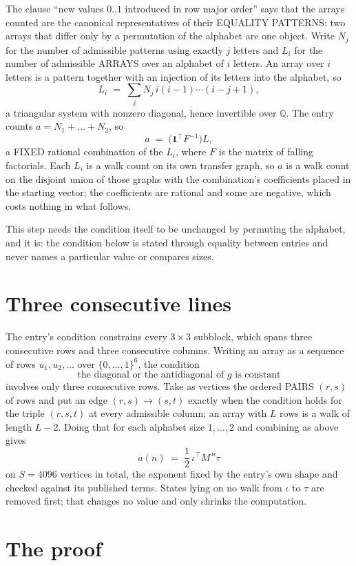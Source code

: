 \documentclass[11pt,a4paper]{article}
\theoremstyle{plain}
\theoremstyle{definition}
\begin{document}
The clause ``new values $0..1$ introduced in row major order'' says that the arrays
counted are the canonical representatives of their EQUALITY PATTERNS: two arrays that differ
only by a permutation of the alphabet are one object. Write $N_j$ for the number of admissible
patterns using exactly $j$ letters and $L_i$ for the number of admissible ARRAYS over an
alphabet of $i$ letters. An array over $i$ letters is a pattern together with an injection of
its letters into the alphabet, so
\[
L_i\;=\;\sum_{j}N_j\,i(i-1)\cdots(i-j+1),
\]
a triangular system with nonzero diagonal, hence invertible over $\mathbb{Q}$. The entry
counts $a=N_1+\dots+N_{2}$, so
\[
a\;=\;\bigl(\mathbf{1}^{\!\top}F^{-1}\bigr)L ,
\]
a FIXED rational combination of the $L_i$, where $F$ is the matrix of falling factorials.
Each $L_i$ is a walk count on its own transfer graph, so $a$ is a walk count on the disjoint
union of those graphs with the combination's coefficients placed in the starting vector; the
coefficients are rational and some are negative, which costs nothing in what follows.

This step needs the condition itself to be unchanged by permuting the alphabet, and it is:
the condition below is stated through equality between entries and never names a particular
value or compares sizes.

\section{Three consecutive lines}

The entry's condition constrains every $3\times3$ subblock, which spans three consecutive
rows and three consecutive columns. Writing an array as a sequence of rows
$u_1,u_2,\dots$ over $\{0,\dots,1\}^{6}$, the condition
\[
\text{the diagonal or the antidiagonal of }g\text{ is constant}
\]
involves only three consecutive rows. Take as vertices the ordered PAIRS $(r,s)$ of
rows and put an edge $(r,s)\to(s,t)$ exactly when the condition holds for the triple
$(r,s,t)$ at every admissible column; an array with $L$ rows is a walk of length $L-2$.
Doing that for each alphabet size $1,\dots,2$ and combining as above gives
\[
a(n)\;=\;\frac{1}{2}\,\iota^{\!\top}M^{\,n}\tau
\]
on $S=4096$ vertices in total, the exponent fixed by the entry's own shape and checked against
its published terms. States lying on no walk from $\iota$ to $\tau$ are removed first; that
changes no value and only shrinks the computation.

\section{The proof}
\end{document}
